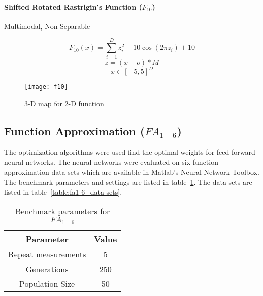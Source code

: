 \paragraph{Shifted Rotated Rastrigin’s Function ($F_{10}$)} Multimodal, Non-Separable

\begin{minipage}{.5\textwidth}
\[
  F_{10}(x)=\sum_{i=1}^{D}{z_i^2 - 10\cos{(2\pi z_i)} + 10}
\]
\[ z=(x-o)*M \]
\[ x \in [-5,5]^D \]
\end{minipage}%
\begin{minipage}{.5\textwidth}
  \begin{figure}[H]
    \centering
    \texttt{[image: f10]}
    \caption{3-D map for 2-D function}
    \label{f10}
  \end{figure}
\end{minipage}




\subsection{Function Approximation ($FA_{1-6}$)}

The optimization algorithms were used find the optimal weights for feed-forward neural networks. The neural networks were evaluated on six function approximation data-sets which are available in Matlab's Neural Network Toolbox. The benchmark parameters and settings are listed in table~\ref{table:fa1-6_params}. The data-sets are listed in table~\ref{table:fa1-6_data-sets}.

\begin{table}[H]
  \centering
  \begin{center}
    \footnotesize
    \begin{tabular}{ | c | c | }
      \hline
      Parameter & Value \\ \hline
      Repeat measurements & 5 \\ \hline
      Generations & 250 \\ \hline
      Population Size & 50 \\ \hline
    \end{tabular}
  \end{center}
  \caption{Benchmark parameters for $FA_{1-6}$}
  \label{table:fa1-6_params}
\end{table}

